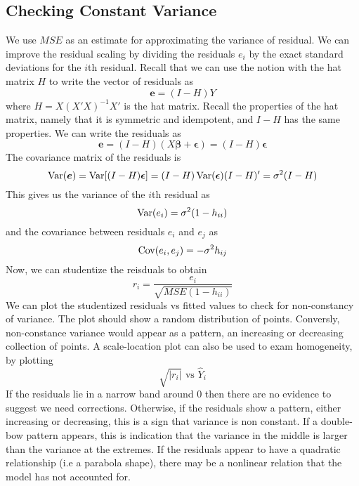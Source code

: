 \subsection{Checking Constant Variance}

We use $MSE$ as an estimate for approximating the variance of residual. We can improve the residual scaling by dividing the residuals $e_i$ by the exact standard deviations for the $i$th residual. Recall that we can use the notion with the hat matrix $H$ to write the vector of residuals as 
\[\boldsymbol{e} = (I-H)Y\]
where $H = X(X'X)^{-1}X'$ is the hat matrix. Recall the properties of the hat matrix, namely that it is symmetric and idempotent, and $I-H$ has the same properties. We can write the residuals as 
\[\boldsymbol{e} = (I-H)(X\boldsymbol{\beta} + \boldsymbol{\epsilon}) = (I-H)\boldsymbol{\epsilon}\]
The covariance matrix of the residuals is 
\[\operatorname{Var}(\boldsymbol{e}) = \operatorname{Var}[(I-H)\boldsymbol{\epsilon}] = (I-H)\operatorname{Var}(\boldsymbol{\epsilon})(I-H)' = \sigma^2(I-H)\]
This gives us the variance of the $i$th residual as
\[\operatorname{Var}(e_i) = \sigma^2(1-h_{ii})\]
and the covariance between residuals $e_i$ and $e_j$ as 
\[\operatorname{Cov}(e_i,e_j) = -\sigma^2h_{ij}\]
Now, we can studentize the reisduals to obtain 
\[r_i = \frac{e_i}{\sqrt{MSE(1-h_{ii})}}\]
We can plot the studentized residuals vs fitted values to check for non-constancy of variance. The plot should show a random distribution of points. Conversly, non-constance variance would appear as a pattern, an increasing or decreasing collection of points. A scale-location plot can also be used to exam homogeneity, by plotting 
\[\sqrt{|r_i|} \text{ vs } \hat{Y}_i\]
If the residuals lie in a narrow band around 0 then there are no evidence to suggest we need corrections. Otherwise, if the residuals show a pattern, either increasing or decreasing, this is a sign that variance is non constant. If a double-bow pattern appears, this is indication that the variance in the middle is larger than the variance at the extremes. If the residuals appear to have a quadratic relationship (i.e a parabola shape), there may be a nonlinear relation that the model has not accounted for.

